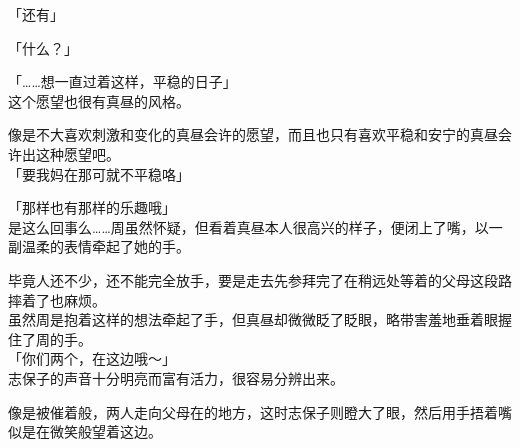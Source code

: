 「还有」

「什么？」

「……想一直过着这样，平稳的日子」\\

这个愿望也很有真昼的风格。

像是不大喜欢刺激和变化的真昼会许的愿望，而且也只有喜欢平稳和安宁的真昼会许出这种愿望吧。\\

「要我妈在那可就不平稳咯」

「那样也有那样的乐趣哦」\\

是这么回事么……周虽然怀疑，但看着真昼本人很高兴的样子，便闭上了嘴，以一副温柔的表情牵起了她的手。

毕竟人还不少，还不能完全放手，要是走去先参拜完了在稍远处等着的父母这段路摔着了也麻烦。\\

虽然周是抱着这样的想法牵起了手，但真昼却微微眨了眨眼，略带害羞地垂着眼握住了周的手。\\

「你们两个，在这边哦～」\\

志保子的声音十分明亮而富有活力，很容易分辨出来。

像是被催着般，两人走向父母在的地方，这时志保子则瞪大了眼，然后用手捂着嘴似是在微笑般望着这边。\\

